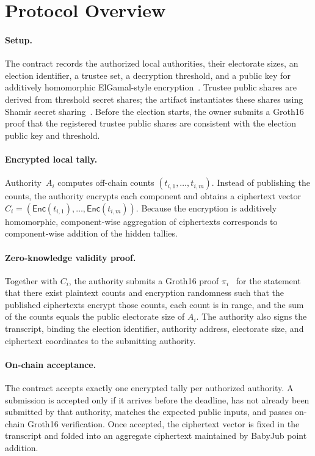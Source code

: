 
\section{Protocol Overview}

\paragraph{Setup.}
The contract records the authorized local authorities, their electorate sizes,
an election identifier, a trustee set, a decryption threshold, and a public key
for additively homomorphic ElGamal-style encryption~\cite{ElGamal85}. Trustee
public shares are derived from threshold secret shares; the artifact
instantiates these shares using Shamir secret sharing~\cite{Shamir79}. Before
the election starts, the owner submits a Groth16 proof that the registered
trustee public shares are consistent with the election public key and
threshold.

\paragraph{Encrypted local tally.}
Authority~$A_i$ computes off-chain counts
$(t_{i,1},\dots,t_{i,m})$. Instead of publishing the counts, the authority
encrypts each component and obtains a ciphertext vector
$C_i=(\mathsf{Enc}(t_{i,1}),\dots,\mathsf{Enc}(t_{i,m}))$. Because the
encryption is additively homomorphic, component-wise aggregation of ciphertexts
corresponds to component-wise addition of the hidden tallies.

\paragraph{Zero-knowledge validity proof.}
Together with $C_i$, the authority submits a Groth16 proof
$\pi_i$~\cite{EC:Groth16} for the statement that there exist plaintext counts
and encryption randomness such that the published ciphertexts encrypt those
counts, each count is in range, and the sum of the counts equals the public
electorate size of $A_i$.
The authority also signs the transcript, binding the election identifier,
authority address, electorate size, and ciphertext coordinates to the
submitting authority.

\paragraph{On-chain acceptance.}
The contract accepts exactly one encrypted tally per authorized authority. A
submission is accepted only if it arrives before the deadline, has not already
been submitted by that authority, matches the expected public inputs, and
passes on-chain Groth16 verification. Once accepted, the ciphertext vector is
fixed in the transcript and folded into an aggregate ciphertext maintained by
BabyJub point addition.

